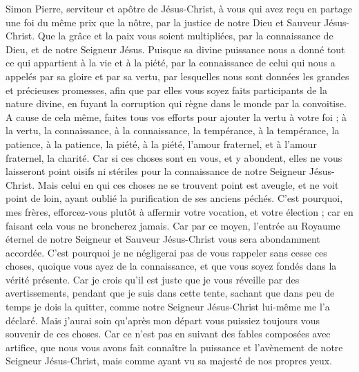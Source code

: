 \begin{multicols}{2}
\TextTitle{[Introduction]}
\VerseOne{}Simon Pierre, serviteur et apôtre de Jésus-Christ, à vous qui avez reçu en partage une foi du même prix que la nôtre, par la justice de notre Dieu et Sauveur Jésus-Christ{}.
Que la grâce et la paix vous soient multipliées, par la connaissance de Dieu, et de notre Seigneur Jésus.
Puisque sa divine puissance nous a donné tout ce qui appartient à la vie et à la piété, par la connaissance de celui qui nous a appelés par sa gloire et par sa vertu,
par lesquelles nous sont données les grandes et précieuses promesses, afin que par elles vous soyez faits participants de la nature divine, en fuyant la corruption qui règne dans le monde par la convoitise.
A cause de cela même, faites tous vos efforts pour ajouter la vertu à votre foi ; à la vertu, la connaissance,
à la connaissance, la tempérance, à la tempérance, la patience, à la patience, la piété,
à la piété, l'amour fraternel, et à l'amour fraternel, la charité.
Car si ces choses sont en vous, et y abondent, elles ne vous laisseront point oisifs ni stériles pour la connaissance de notre Seigneur Jésus-Christ.
Mais celui en qui ces choses ne se trouvent point est aveugle, et ne voit point de loin, ayant oublié la purification de ses anciens péchés.
C'est pourquoi, mes frères, efforcez-vous plutôt à affermir votre vocation, et votre élection ; car en faisant cela vous ne broncherez jamais.
Car par ce moyen, l'entrée au Royaume éternel de notre Seigneur et Sauveur Jésus-Christ vous sera abondamment accordée.
C'est pourquoi je ne négligerai pas de vous rappeler sans cesse ces choses, quoique vous ayez de la connaissance, et que vous soyez fondés dans la vérité présente.
Car je crois qu'il est juste que je vous réveille par des avertissements, pendant que je suis dans cette tente{},
sachant que dans peu de temps je dois la quitter, comme notre Seigneur Jésus-Christ lui-même me l'a déclaré.
Mais j'aurai soin qu’après mon départ vous puissiez toujours vous souvenir de ces choses.
Car ce n’est pas en suivant des fables composées avec artifice, que nous vous avons fait connaître la puissance et l’avènement{} de notre Seigneur Jésus-Christ, mais comme ayant vu sa majesté de nos propres yeux.

\end{multicols}
